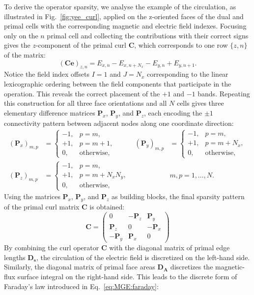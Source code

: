 To derive the operator sparsity, we analyse the example of the circulation, as illustrated in Fig.~\ref{fig:yee_curl}, applied on the z-oriented faces of the dual and primal cells with the corresponding magnetic and electric field indexes. Focusing only on the $n$ primal cell and collecting the contributions with their correct signs gives the $z$-component of the primal curl $\mathbf{C}$, which corresponds to one row $\{z,n\}$ of the matrix:
%
\begin{equation}
(\mathbf{C}\mathbf{e})_{z,n} =E_{x,n}-E_{x,n+N_x}-E_{y,n}+E_{y,n+1}.
\end{equation}
%
Notice the field index offsets $I=1$ and $J=N_x$ corresponding to the linear lexicographic ordering between the field components that participate in the operation. This reveals the correct placement of the $+1$ and $-1$ bands. Repeating this construction for all three face orientations and all $N$ cells gives three elementary difference matrices $\mathbf{P}_x$, $\mathbf{P}_y$, and $\mathbf{P}_z$, each encoding the $\pm1$ connectivity pattern between adjacent nodes along one coordinate direction:
%
\begin{equation}
\begin{aligned}
(\mathbf{P}_x)_{m,p} &=
\begin{cases}
-1, & p=m,\\ +1, & p=m+1,\\ 0, & \text{otherwise},
\end{cases}
& (\mathbf{P}_y)_{m,p} &=
\begin{cases}
-1, & p=m,\\ +1, & p=m+N_x,\\ 0, & \text{otherwise},
\end{cases}
\\[4pt]
(\mathbf{P}_z)_{m,p} &=
\begin{cases}
-1, & p=m,\\ +1, & p=m+N_xN_y,\\ 0, & \text{otherwise},
\end{cases}
&& m,p=1,\ldots,N.
\end{aligned}
\label{eq:Pmatrices}
\end{equation}
%
Using the matrices $\mathbf{P}_x$, $\mathbf{P}_y$, and $\mathbf{P}_z$ as building blocks, the final sparsity pattern of the primal curl matrix $\mathbf{C}$ is obtained:
%
\begin{equation}
\mathbf{C} =
\begin{pmatrix}
0 & -\mathbf{P}_z & \mathbf{P}_y \\
\mathbf{P}_z &  0          & -\mathbf{P}_x \\
-\mathbf{P}_y & \mathbf{P}_x & 0
\end{pmatrix}
\label{eq:C_matrix}
\end{equation}
%
By combining the curl operator $\mathbf{C}$ with the diagonal matrix of primal edge lengths $\mathbf{D_s}$, the circulation of the electric field is discretized on the left-hand side. Similarly, the diagonal matrix of primal face areas $\mathbf{D_A}$ discretizes the magnetic-flux surface integral on the right-hand side. This leads to the discrete form of Faraday's law introduced in Eq.~\eqref{eq:MGE:faraday}:

